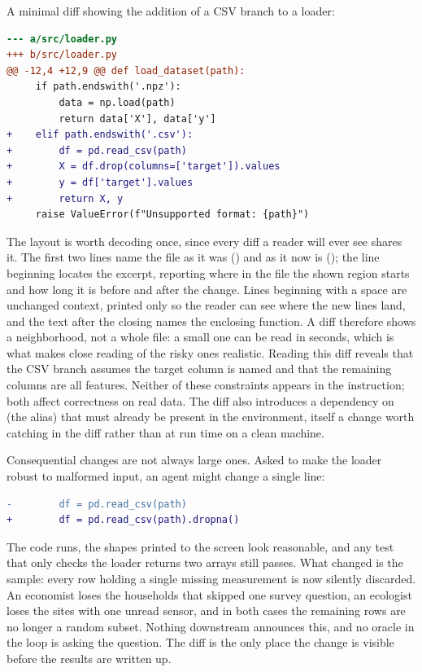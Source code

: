 \begin{example}
A minimal diff showing the addition of a CSV branch to a loader:
\begin{lstlisting}[language=diff]
--- a/src/loader.py
+++ b/src/loader.py
@@ -12,4 +12,9 @@ def load_dataset(path):
     if path.endswith('.npz'):
         data = np.load(path)
         return data['X'], data['y']
+    elif path.endswith('.csv'):
+        df = pd.read_csv(path)
+        X = df.drop(columns=['target']).values
+        y = df['target'].values
+        return X, y
     raise ValueError(f"Unsupported format: {path}")
\end{lstlisting}
The layout is worth decoding once, since every diff a reader will ever see shares it.
The first two lines name the file as it was () and as it now is ();
the line beginning  locates the excerpt, reporting where in the file the shown region starts and how long it is before and after the change.
Lines beginning with a space are unchanged context, printed only so the reader can see where the new lines land,
and the text after the closing  names the enclosing function.
A diff therefore shows a neighborhood, not a whole file: a small one can be read in seconds, which is what makes close reading of the risky ones realistic.
Reading this diff reveals that the CSV branch assumes the target column is named  and that the remaining columns are all features.
Neither of these constraints appears in the instruction; both affect correctness on real data.
The diff also introduces a dependency on  (the  alias) that must already be present in the environment, itself a change worth catching in the diff rather than at run time on a clean machine.
\end{example}

\begin{example}
Consequential changes are not always large ones.
Asked to make the loader robust to malformed input, an agent might change a single line:
\begin{lstlisting}[language=diff]
-        df = pd.read_csv(path)
+        df = pd.read_csv(path).dropna()
\end{lstlisting}
The code runs, the shapes printed to the screen look reasonable, and any test that only checks the loader returns two arrays still passes.
What changed is the sample: every row holding a single missing measurement is now silently discarded.
An economist loses the households that skipped one survey question, an ecologist loses the sites with one unread sensor, and in both cases the remaining rows are no longer a random subset.
Nothing downstream announces this, and no oracle in the loop is asking the question.
The diff is the only place the change is visible before the results are written up.
\end{example}

